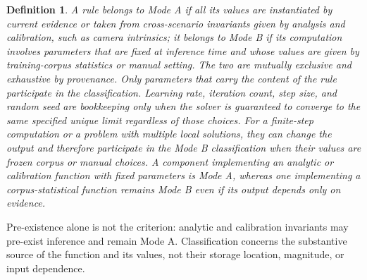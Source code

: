 \documentclass[twoside,11pt]{article}
\newtheorem{defn}{Definition}
\begin{document}
\begin{defn}
A rule belongs to \emph{Mode A} if all its values are instantiated by current evidence or taken from cross-scenario invariants given by analysis and calibration, such as camera intrinsics; it belongs to \emph{Mode B} if its computation involves parameters that are fixed at inference time and whose values are given by training-corpus statistics or manual setting. The two are mutually exclusive and exhaustive by provenance. Only parameters that carry the content of the rule participate in the classification. Learning rate, iteration count, step size, and random seed are bookkeeping only when the solver is guaranteed to converge to the same specified unique limit regardless of those choices. For a finite-step computation or a problem with multiple local solutions, they can change the output and therefore participate in the Mode B classification when their values are frozen corpus or manual choices. A component implementing an analytic or calibration function with fixed parameters is Mode A, whereas one implementing a corpus-statistical function remains Mode B even if its output depends only on evidence.
\end{defn}

Pre-existence alone is not the criterion: analytic and calibration invariants may pre-exist inference and remain Mode A. Classification concerns the substantive source of the function and its values, not their storage location, magnitude, or input dependence.
\end{document}
